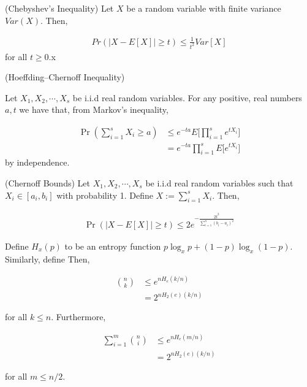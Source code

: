 \documentclass[main.tex]{subfiles}
\begin{document}
\begin{proposition}(Chebyshev's Inequality)
Let $X$ be a random variable with finite variance $Var(X)$. Then, 

\begin{align*}
	Pr(|X - E[X]| \geq t) \leq \frac{1}{t^2} Var[X]	
\end{align*}
for all $t \geq 0$.x
\end{proposition}

\begin{proposition}(Hoeffding--Chernoff Inequality)
\label{lem:chernoff}

Let $X_1, X_2, \cdots, X_s$	be i.i.d real random variables. For any positive, real numbers $a, t$ we have that, from Markov's inequality,

\begin{align*}
\Pr(\sum_{i=1}^s X_i \geq a)
&\leq e^{-ta} E\Bigg[\prod_{i=1}^s e^{tX_i}\Bigg]\\
&= e^{-ta} \prod_{i=1}^s E\Bigg[e^{tX_i}\Bigg]
\end{align*}
by independence.

\end{proposition}

\begin{corollary}(Chernoff Bounds)
\label{cor:chernoff-bound}
Let $X_1, X_2, \cdots, X_s$	be i.i.d real random variables such that $X_i \in [a_i, b_i]$ with probability 1. Define $X :=  \sum_{i=1}^s X_i$. Then, 

\begin{align*}
\Pr(|X - E[X]| \geq t) \leq 2e^{- \frac{2t^2}{\sum_{i=1}^n (b_i - a_i)^2}}
\end{align*}
\end{corollary}

\begin{example}
\label{ex:fact7-samplecomplexity}
Define $H_x(p)$ to be an entropy function $p\log_x p + (1-p) \log_x (1-p)$. Similarly, define Then,

\begin{align*}
	\binom{n}{k} &\leq e^{nH_{e}(k/n)} \\
	&= 2^{nH_2(e)(k/n)} 
\end{align*}

for all $k \leq n$. Furthermore,

\begin{align*}
\sum_{i = 1}^m \binom{n}{i} &\leq e^{nH_{e}(m/n)} \\
	&= 2^{nH_2(e)(k/n)} 	
\end{align*}

for all $m \leq n /2$.
\end{example}
\end{document}
